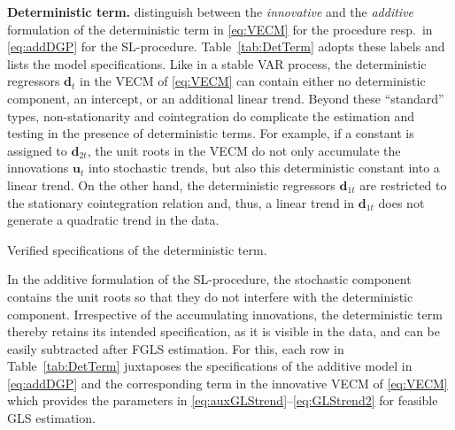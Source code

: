 \textbf{Deterministic term.} \citet{JohansenNielsen2018} distinguish between the \textit{innovative} and the \textit{additive} formulation of the deterministic term in \eqref{eq:VECM} for the \citeauthor{Johansen1996} procedure resp.~in \eqref{eq:addDGP} for the SL-procedure. Table~\ref{tab:DetTerm} adopts these labels and lists the model specifications. Like in a stable VAR process, the deterministic regressors $\boldsymbol{d}_t $ in the VECM of \eqref{eq:VECM} can contain either no deterministic component, an intercept, or an additional linear trend. Beyond these ``standard'' types, non-stationarity and cointegration do complicate the estimation and testing in the presence of deterministic terms. For example, if a constant is assigned to $ \boldsymbol{d}_{2t} $, the unit roots in the VECM do not only accumulate the innovations $ \boldsymbol{u}_t $ into stochastic trends, but also this deterministic constant into a linear trend. On the other hand, the deterministic regressors $ \boldsymbol{d}_{1t} $ are restricted to the stationary cointegration relation and, thus, a linear trend in $ \boldsymbol{d}_{1t} $ does not generate a quadratic trend in the data. 
\begin{table}[ht]	%
	\centering
	\caption{Verified specifications of the deterministic term.}
	\resizebox{\textwidth}{!}{
		}
	\label{tab:DetTerm}		
\end{table}
In the additive formulation of the SL-procedure, the stochastic component contains the unit roots so that they do not interfere with the deterministic component. Irrespective of the accumulating innovations, the deterministic term thereby retains its intended specification, as it is visible in the data, and can be easily subtracted after FGLS estimation. For this, each row in Table~\ref{tab:DetTerm} juxtaposes the specifications of the additive model in \eqref{eq:addDGP} and the corresponding term in the innovative VECM of \eqref{eq:VECM} which provides the parameters in \eqref{eq:auxGLStrend}--\eqref{eq:GLStrend2} for feasible GLS estimation.

